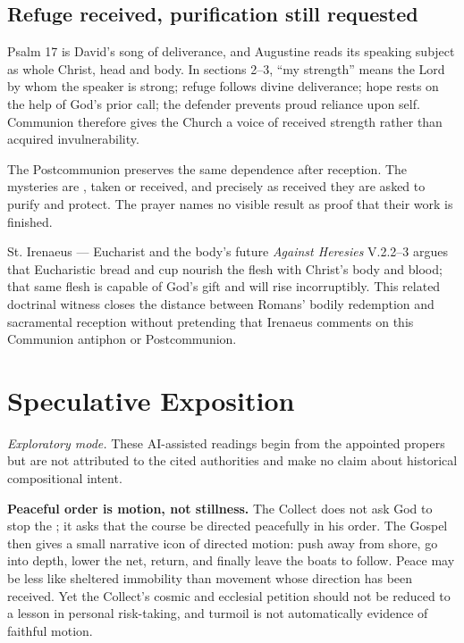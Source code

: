 \begin{deepstudy}
\subsection*{Refuge received, purification still requested\enspace{}}

Psalm 17 is David's song of deliverance, and Augustine reads its speaking subject as whole Christ, head and body. In sections 2--3, ``my strength'' means the Lord by whom the speaker is strong; refuge follows divine deliverance; hope rests on the help of God's prior call; the defender prevents proud reliance upon self. Communion therefore gives the Church a voice of received strength rather than acquired invulnerability.

The Postcommunion preserves the same dependence after reception. The mysteries are , taken or received, and precisely as received they are asked to purify and protect. The prayer names no visible result as proof that their work is finished.

\begin{sourcecard}{St. Irenaeus --- Eucharist and the body's future}
\emph{Against Heresies} V.2.2--3 argues that Eucharistic bread and cup nourish the flesh with Christ's body and blood; that same flesh is capable of God's gift and will rise incorruptibly. This related doctrinal witness closes the distance between Romans' bodily redemption and sacramental reception without pretending that Irenaeus comments on this Communion antiphon or Postcommunion.
\end{sourcecard}

\section*{Speculative Exposition}

\emph{Exploratory mode.} These AI-assisted readings begin from the appointed propers but are not attributed to the cited authorities and make no claim about historical compositional intent.

\noindent\textbf{Peaceful order is motion, not stillness.\enspace{}}
The Collect does not ask God to stop the ; it asks that the course be directed peacefully in his order. The Gospel then gives a small narrative icon of directed motion: push away from shore, go into depth, lower the net, return, and finally leave the boats to follow. Peace may be less like sheltered immobility than movement whose direction has been received. Yet the Collect's cosmic and ecclesial petition should not be reduced to a lesson in personal risk-taking, and turmoil is not automatically evidence of faithful motion.


\end{deepstudy}
